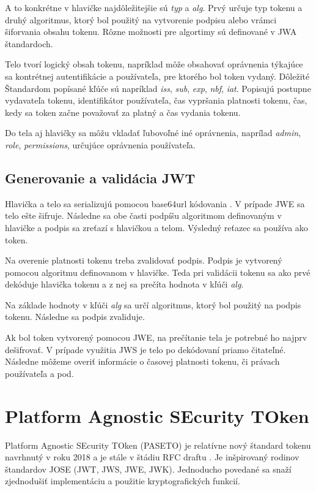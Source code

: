 A to konkrétne v hlavičke najdôležitejšie sú \textit{typ} a \textit{alg}. Prvý určuje typ tokenu a druhý algoritmus, ktorý bol použitý na vytvorenie podpisu alebo vrámci šiforvania obsahu tokenu. Rôzne možnosti pre algortimy sú definované v JWA štandardoch.

Telo tvorí logický obsah tokenu, napríklad môže obsahovať oprávnenia týkajúce sa kontrétnej autentifikácie a používateľa, pre ktorého bol token vydaný. Dôležité Štandardom popísané kľúče sú napríklad \textit{iss}, \textit{sub}, \textit{exp}, \textit{nbf}, \textit{iat}. Popisujú postupne vydavateľa tokenu, identifikátor používateľa, čas vypršania platnosti tokenu, čas, kedy sa token začne považovať za platný a čas vydania tokenu.

Do tela aj hlavičky sa môžu vkladať ľubovoľné iné oprávnenia, naprílad \textit{admin}, \textit{role}, \textit{permissions}, určujúce oprávnenia používateľa.

\subsection{Generovanie a validácia JWT}

Hlavička a telo sa serializujú pomocou base64url kódovania \cite{base64_rfc}. V prípade JWE sa telo ešte šifruje. Následne sa obe časti podpíšu algoritmom definovaným v hlavičke a podpis sa zreťazí s hlavičkou a telom. Výsledný reťazec sa používa ako token.

Na overenie platnosti tokenu treba zvalidovať podpis. Podpis je vytvorený pomocou algoritmu definovanom v hlavičke. Teda pri validácii tokenu sa ako prvé dekóduje hlavička tokenu a z nej sa prečíta hodnota v kľúči \textit{alg}.

Na základe hodnoty v kľúči \textit{alg} sa určí algoritmus, ktorý bol použitý na podpis tokenu. Následne sa podpis zvaliduje. 

Ak bol token vytvorený pomocou JWE, na prečítanie tela je potrebné ho najprv dešifrovať. V prípade využitia JWS je telo po dekódovaní priamo čitateľné. Následne môžeme overiť informácie o časovej platnosti tokenu, či právach používateľa a pod.

\section{Platform Agnostic SEcurity TOken}

Platform Agnostic SEcurity TOken (PASETO) je relatívne nový štandard tokenu navrhnutý v roku 2018 a je stále v štádiu RFC draftu \cite{paseto_rfc}. Je inšpirovaný rodinov štandardov JOSE (JWT, JWS, JWE, JWK). Jednoducho povedané sa snaží zjednodušiť implementáciu a použitie kryptografických funkcií.

